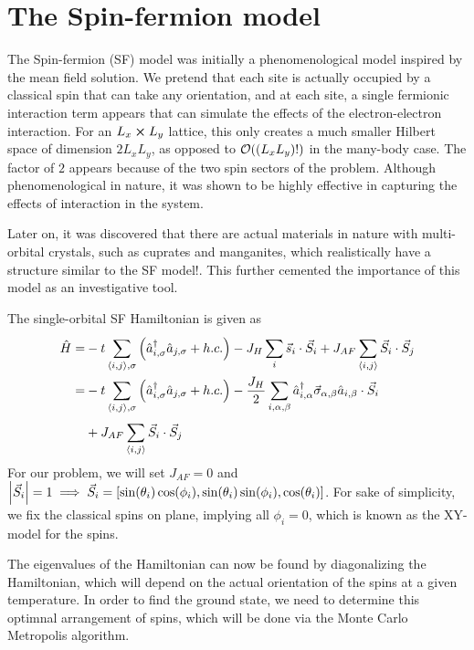 \documentclass[]{article}
\newcommand{\ahat}{\hat{a}}
\newcommand{\ahatd}{\hat{a}^{\dagger}}
\newcommand{\ham}{\hat{H}}
\newcommand{\slims}[2]{\sum\limits_{#1}^{#2}}
\begin{document}
\section{The Spin-fermion model}
The Spin-fermion (SF) model was initially a phenomenological model inspired by the mean field solution. We pretend that each site is actually occupied by a classical spin that can take any orientation, and at each site, a single fermionic interaction term appears that can simulate the effects of the electron-electron interaction. For an $ L_x \cross L_y $ lattice, this only creates a much smaller Hilbert space of dimension $ 2 L_x L_y $, as opposed to $ \order{(L_x L_y)!} $ in the many-body case. The factor of $ 2 $ appears because of the two spin sectors of the problem. Although phenomenological in nature, it was shown to be highly effective in capturing the effects of interaction in the system.

Later on, it was discovered that there are actual materials in nature with multi-orbital crystals, such as cuprates and manganites, which realistically have a structure similar to the SF model!\cite{dagotto_2011}. This further cemented the importance of this model as an investigative tool.

The single-orbital SF Hamiltonian is given as
\begin{align}
\nonumber
\ham =& -t \slims{\expval{i,j},\sigma}{} \left( {\ahatd}_{i,\sigma} {\ahat}_{j,\sigma} + h.c. \right) - J_H \slims{i}{} \vec{s}_i \cdot \vec{S}_i + J_{AF} \slims{\expval{i,j}}{} \vec{S}_i \cdot \vec{S}_j\\
\nonumber
=& -t \slims{\expval{i,j},\sigma}{} \left( {\ahatd}_{i,\sigma} {\ahat}_{j,\sigma} + h.c. \right) - \frac{J_H}{2} \slims{i, \alpha, \beta}{} \ahatd_{i,\alpha} \vec{\sigma}_{\alpha, \beta} \ahat_{i, \beta}  \cdot \vec{S}_i \\
&+ J_{AF} \slims{\expval{i,j}}{} \vec{S}_i \cdot \vec{S}_j
\end{align}
For our problem, we will set $ J_{AF} = 0 $ and $ \abs{\vec{S}_i} = 1 \implies \vec{S}_i = \left[\sin(\theta_i) \cos(\phi_i), \sin(\theta_i) \sin(\phi_i), \cos(\theta_i) \right] $. For sake of simplicity, we fix the classical spins on plane, implying all $ \phi_i=0 $, which is known as the XY-model for the spins.

The eigenvalues of the Hamiltonian can now be found by diagonalizing the Hamiltonian, which will depend on the actual orientation of the spins at a given temperature. In order to find the ground state, we need to determine this optimnal arrangement of spins, which will be done via the Monte Carlo Metropolis algorithm.
\end{document}
